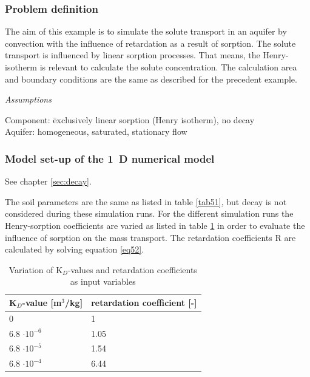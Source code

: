 \subsubsection*{Problem definition}

The aim of this example is to simulate the solute transport in an aquifer by convection with the influence of retardation as a result of sorption. The solute transport is influenced by linear sorption processes. That means, the Henry-isotherm is relevant to calculate the solute concentration. The calculation area and boundary conditions are the same as described for the precedent example.

\textsl{Assumptions}

\begin{tabbing}
Component: \= exclusively linear sorption (Henry isotherm), no decay \\
Aquifer: \> homogeneous, saturated, stationary flow \\
\end{tabbing}

\subsubsection*{Model set-up of the 1~D numerical model}

See chapter \ref{sec:decay}.

The soil parameters are the same as listed in table \ref{tab51}, but decay is not considered during these simulation runs. For the different simulation runs the Henry-sorption coefficients are varied as listed in table \ref{tab52} in order to evaluate the influence of sorption on the mass transport. The retardation coefficients R are calculated by solving equation \ref{eq52}.

\begin{table}[htbp]
\centering
\begin{tabular}{|l|l|}
\hline
K$_D$-value [m$^3$/kg] & retardation coefficient [-] \\
\hline
0  & 1  \\			
\hline
6.8 $\cdot 10^{-6}$ & 1.05 \\
\hline
6.8 $\cdot 10^{-5}$ & 1.54  \\
\hline
6.8 $\cdot 10^{-4}$ & 6.44  \\
\hline
\end{tabular}
\caption{Variation of K$_D$-values and retardation coefficients as input variables}
\label{tab52}
\end{table}

